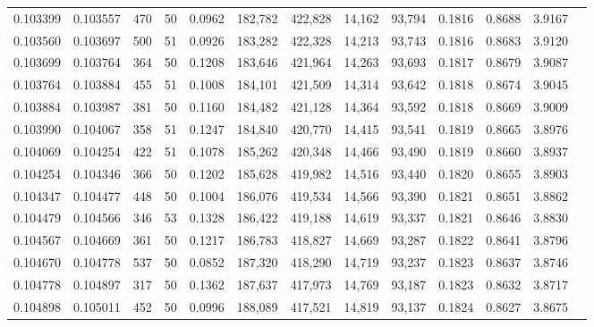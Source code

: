 \begin{tabular}{rrrrrrrrrrrrr}
0.103399 & 0.103557 &   470 &  50 &                                     0.0962 & 182,782 & 422,828 &  14,162 &  93,794 & 0.1816 & 0.8688 & 3.9167 \\
0.103560 & 0.103697 &   500 &  51 &                                     0.0926 & 183,282 & 422,328 &  14,213 &  93,743 & 0.1816 & 0.8683 & 3.9120 \\
0.103699 & 0.103764 &   364 &  50 &                                     0.1208 & 183,646 & 421,964 &  14,263 &  93,693 & 0.1817 & 0.8679 & 3.9087 \\
0.103764 & 0.103884 &   455 &  51 &                                     0.1008 & 184,101 & 421,509 &  14,314 &  93,642 & 0.1818 & 0.8674 & 3.9045 \\
0.103884 & 0.103987 &   381 &  50 &                                     0.1160 & 184,482 & 421,128 &  14,364 &  93,592 & 0.1818 & 0.8669 & 3.9009 \\
0.103990 & 0.104067 &   358 &  51 &                                     0.1247 & 184,840 & 420,770 &  14,415 &  93,541 & 0.1819 & 0.8665 & 3.8976 \\
0.104069 & 0.104254 &   422 &  51 &                                     0.1078 & 185,262 & 420,348 &  14,466 &  93,490 & 0.1819 & 0.8660 & 3.8937 \\
0.104254 & 0.104346 &   366 &  50 &                                     0.1202 & 185,628 & 419,982 &  14,516 &  93,440 & 0.1820 & 0.8655 & 3.8903 \\
0.104347 & 0.104477 &   448 &  50 &                                     0.1004 & 186,076 & 419,534 &  14,566 &  93,390 & 0.1821 & 0.8651 & 3.8862 \\
0.104479 & 0.104566 &   346 &  53 &                                     0.1328 & 186,422 & 419,188 &  14,619 &  93,337 & 0.1821 & 0.8646 & 3.8830 \\
0.104567 & 0.104669 &   361 &  50 &                                     0.1217 & 186,783 & 418,827 &  14,669 &  93,287 & 0.1822 & 0.8641 & 3.8796 \\
0.104670 & 0.104778 &   537 &  50 &                                     0.0852 & 187,320 & 418,290 &  14,719 &  93,237 & 0.1823 & 0.8637 & 3.8746 \\
0.104778 & 0.104897 &   317 &  50 &                                     0.1362 & 187,637 & 417,973 &  14,769 &  93,187 & 0.1823 & 0.8632 & 3.8717 \\
0.104898 & 0.105011 &   452 &  50 &                                     0.0996 & 188,089 & 417,521 &  14,819 &  93,137 & 0.1824 & 0.8627 & 3.8675 \\

\end{tabular}
